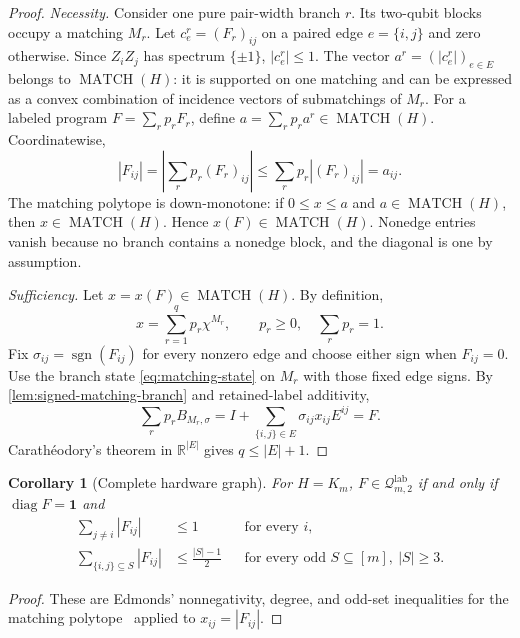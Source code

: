 \documentclass[11pt]{article}
\newtheorem{corollary}[corollary]{Corollary}
\theoremstyle{definition}
\theoremstyle{remark}
\newcommand{\R}{\mathbb{R}}
\newcommand{\Q}{\mathcal{Q}}
\newcommand{\MATCH}{\operatorname{MATCH}}
\newcommand{\diag}{\operatorname{diag}}
\newcommand{\sgn}{\operatorname{sgn}}
\newcommand{\lab}{\mathrm{lab}}
\newcommand{\ones}{\mathbf{1}}
\begin{document}
\begin{proof}
\emph{Necessity.} Consider one pure pair-width branch $r$. Its two-qubit blocks occupy a matching $M_r$. Let $c^r_e=(F_r)_{ij}$ on a paired edge $e=\{i,j\}$ and zero otherwise. Since $Z_iZ_j$ has spectrum $\{\pm1\}$, $|c^r_e|\le1$. The vector $a^r=(|c^r_e|)_{e\in E}$ belongs to $\MATCH(H)$: it is supported on one matching and can be expressed as a convex combination of incidence vectors of submatchings of $M_r$. For a labeled program $F=\sum_rp_rF_r$, define $a=\sum_rp_ra^r\in\MATCH(H)$. Coordinatewise,
\begin{equation}
  |F_{ij}|=\left|\sum_rp_r(F_r)_{ij}\right|
  \le\sum_rp_r|(F_r)_{ij}|=a_{ij}.
\end{equation}
The matching polytope is down-monotone: if $0\le x\le a$ and $a\in\MATCH(H)$, then $x\in\MATCH(H)$. Hence $x(F)\in\MATCH(H)$. Nonedge entries vanish because no branch contains a nonedge block, and the diagonal is one by assumption.

\emph{Sufficiency.} Let $x=x(F)\in\MATCH(H)$. By definition,
\begin{equation}
  x=\sum_{r=1}^{q}p_r\chi^{M_r},
  \qquad p_r\ge0,\quad \sum_rp_r=1.
  \label{eq:matching-decomposition}
\end{equation}
Fix $\sigma_{ij}=\sgn(F_{ij})$ for every nonzero edge and choose either sign when $F_{ij}=0$. Use the branch state \cref{eq:matching-state} on $M_r$ with those fixed edge signs. By \cref{lem:signed-matching-branch} and retained-label additivity,
\begin{equation}
  \sum_rp_rB_{M_r,\sigma}
  =I+\sum_{\{i,j\}\in E}\sigma_{ij}x_{ij}E^{ij}=F.
\end{equation}
Carath\'eodory's theorem in $\R^{|E|}$ gives $q\le|E|+1$.
\end{proof}

\begin{corollary}[Complete hardware graph]
\label{cor:complete-graph}
For $H=K_m$, $F\in\Q^{\lab}_{m,2}$ if and only if $\diag F=\ones$ and
\begin{align}
  \sum_{j\ne i}|F_{ij}|&\le1
  &&\text{for every }i,\label{eq:degree-constraints}\\
  \sum_{\{i,j\}\subseteq S}|F_{ij}|&\le\frac{|S|-1}{2}
  &&\text{for every odd }S\subseteq[m],\ |S|\ge3.
  \label{eq:odd-set-constraints}
\end{align}
\end{corollary}

\begin{proof}
These are Edmonds' nonnegativity, degree, and odd-set inequalities for the matching polytope~\cite{Edmonds1965,Schrijver2003} applied to $x_{ij}=|F_{ij}|$.
\end{proof}
\end{document}
